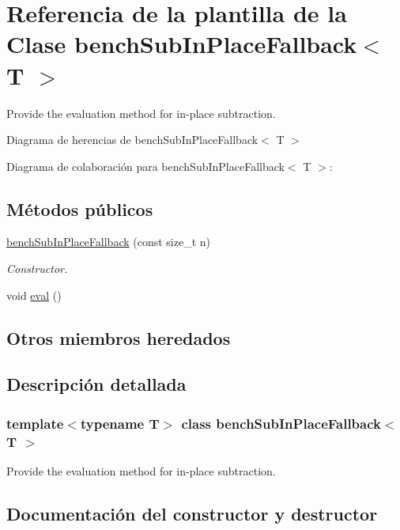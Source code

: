 \hypertarget{classbenchSubInPlaceFallback}{}\section{Referencia de la plantilla de la Clase bench\+Sub\+In\+Place\+Fallback$<$ T $>$}
\label{classbenchSubInPlaceFallback}


Provide the evaluation method for in-\/place subtraction.  




Diagrama de herencias de bench\+Sub\+In\+Place\+Fallback$<$ T $>$


Diagrama de colaboración para bench\+Sub\+In\+Place\+Fallback$<$ T $>$\+:
\subsection*{Métodos públicos}
\begin{DoxyCompactItemize}
\item 
\hyperlink{classbenchSubInPlaceFallback_a3de18a2620cedc8d9d6a185243741618}{bench\+Sub\+In\+Place\+Fallback} (const size\+\_\+t n)
\begin{DoxyCompactList}\small\item\em Constructor. \end{DoxyCompactList}\item 
void \hyperlink{classbenchSubInPlaceFallback_ad7b8c5b4ae82a1b93c5b89dda35079b8}{eval} ()
\end{DoxyCompactItemize}
\subsection*{Otros miembros heredados}


\subsection{Descripción detallada}
\subsubsection*{template$<$typename T$>$\newline
class bench\+Sub\+In\+Place\+Fallback$<$ T $>$}

Provide the evaluation method for in-\/place subtraction. 

\subsection{Documentación del constructor y destructor}
\mbox{\label{classbenchSubInPlaceFallback_a3de18a2620cedc8d9d6a185243741618}} 
